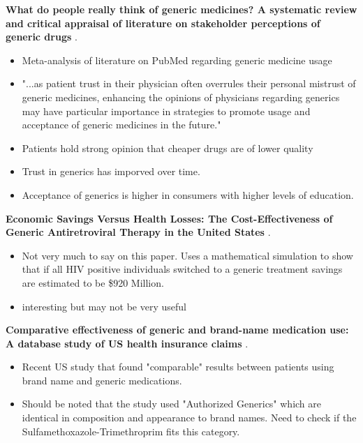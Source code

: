 \noindent\textbf{What do people really think of generic medicines? A systematic review and critical appraisal of literature on stakeholder perceptions of generic drugs} \cite{dunne_what_2015}.\\
\begin{itemize}
    \item Meta-analysis of literature on PubMed regarding generic medicine usage
    \item  "...as patient trust in their physician often overrules their personal mistrust of generic medicines, enhancing the opinions of physicians regarding generics may have particular importance in strategies to promote usage and acceptance of generic medicines in the future."
    \item Patients hold strong opinion that cheaper drugs are of lower quality
    \item Trust in generics has imporved over time. 
    \item Acceptance of generics is higher in consumers with higher levels of education.
\end{itemize}

\noindent\textbf{Economic Savings Versus Health Losses: The Cost-Effectiveness of Generic Antiretroviral Therapy in the United States} \cite{walensky_economic_2013}.\\
\begin{itemize}
    \item Not very much to say on this paper. Uses a mathematical simulation to show that if all HIV positive individuals switched to a generic treatment savings are estimated to be \$920 Million.
    \item interesting but may not be very useful
\end{itemize}

\noindent\textbf{Comparative effectiveness of generic and brand-name medication use: A database study of US health insurance claims} \cite{desai_comparative_2019}.\\
\begin{itemize}
    \item Recent US study that found "comparable" results between patients using brand name and generic medications.
    \item Should be noted that the study used "Authorized Generics" which are identical in composition and appearance to brand names. Need to check if the Sulfamethoxazole-Trimethroprim fits this category.
\end{itemize}

\newpage

 


